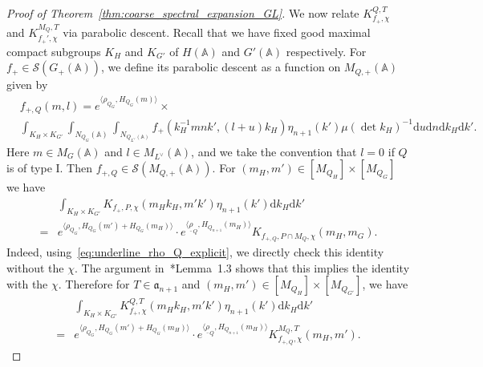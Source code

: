 \documentclass[letterpaper,11pt]{amsart}
\newcommand{\fa}{\mathfrak{a}}
\newcommand{\bA}{\mathbb{A}}
\newcommand{\cS}{\mathcal{S}}
\newcommand{\rd}{\mathrm{d}}
\newcommand{\<}{\negthickspace}
\theoremstyle{definition}
\theoremstyle{plain}
\theoremstyle{remark}
\numberwithin{equation}{section}
\begin{document}
\begin{proof}[Proof of Theorem~\ref{thm:coarse_spectral_expansion_GL}]
We now relate $K_{f_+, \chi}^{Q, T}$ and  $K_{f_+', \chi}^{M_Q, T}$ via
parabolic descent. Recall that we have fixed good maximal compact subgroups
$K_H$ and $K_{G'}$ of $H(\bA)$ and $G'(\bA)$ respectively. For $f_+ \in
\cS(G_+(\bA))$, we define its parabolic descent as a function on
$M_{Q, +}(\bA)$ given by
    \begin{equation}    \label{eq:parabolic_descent_spectral_GL}
    \begin{aligned}
    & f_{+,Q}(m, l) = e^{\langle \rho_{Q_G},H_{Q_G}(m) \rangle}  \times \\
    & \int_{K_H \times K_{G'}} \int_{{N_{Q_G}}(\bA)} \int_{N_{Q_{L^\vee}(\bA)}}
    f_+(k_H^{-1}mnk',(l + u)k_H) \eta_{n+1}(k') \mu(\det k_H)^{-1} \rd u \rd n  \rd k_H \rd k'.
    \end{aligned}
    \end{equation}
Here $m \in M_G(\bA)$ and $l \in M_{L^\vee}(\bA)$, and we take the convention that $l = 0$ if $Q$ is of type I.
Then $f_{+, Q} \in
\cS(M_{Q, +}(\bA))$. For $(m_H, m') \in [M_{Q_H}] \times [M_{Q_{G}}]$ we have
    \[
    \begin{aligned}
    &\int_{K_H \times K_{G'}} K_{f_+,P, \chi}(m_H k_H,m' k') \eta_{n+1}(k')
    \rd k_H \rd k'\\
    =
    &e^{ \langle \rho_{Q_G},H_{Q_G}(m')+H_{Q_G}(m_H) \rangle}
    \cdot e^{ \langle \underline{\rho}_Q,H_{Q_{n+1}}(m_H) \rangle}
    K_{f_{+,Q},P \cap M_Q, \chi}(m_H,m_G).
    \end{aligned}
    \]
Indeed, using~\eqref{eq:underline_rho_Q_explicit}, we directly check this
identity without the $\chi$. The argument in~\cite{Zydor3}*{Lemma~1.3} shows
that this implies the identity with the $\chi$.
Therefore for $T \in \fa_{n+1}$ and $(m_H, m') \in [M_{Q_H}] \times [M_{Q_{G'}}]$,
we have
    \begin{equation}    \label{eq:distribution_parabolic_descent}
    \begin{aligned}
    &\int_{K_H \times K_{G'}} K_{f_+,\chi}^{Q,T} (m_H k_H,m' k') \eta_{n+1}(k')
    \rd k_H \rd k'\\
    = &e^{ \langle \rho_{Q_G},H_{Q_G}(m')+H_{Q_G}(m_H) \rangle}
    \cdot e^{ \langle \underline{\rho}_Q,H_{Q_{n+1}}(m_H) \rangle}
    K_{f_{+,Q},\chi}^{M_Q,T}(m_H,m').
    \end{aligned}
    \end{equation}




\end{proof}
\end{document}
